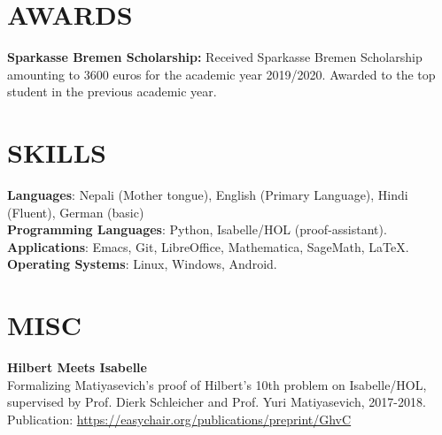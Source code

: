 \documentclass[margin]{res}
\begin{document}
\begin{resume}
\section{AWARDS}
\textbf{Sparkasse Bremen Scholarship:} Received Sparkasse Bremen Scholarship amounting to 3600 euros for the academic year 2019/2020. Awarded to the top student in the previous academic year.

\section{SKILLS}
\textbf{Languages}: Nepali (Mother tongue), English (Primary Language), Hindi (Fluent), German (basic)\\
\textbf{Programming Languages}: Python, Isabelle/HOL (proof-assistant).
\\
\textbf{Applications}: Emacs, Git, LibreOffice, Mathematica, SageMath, \LaTeX.
\\
\textbf{Operating Systems}: 
Linux, Windows, Android.

\section{MISC}
\par
\textbf{Hilbert Meets Isabelle}\\ 
Formalizing Matiyasevich's proof of Hilbert's 10th problem on Isabelle/HOL, supervised by Prof. Dierk Schleicher and Prof. Yuri Matiyasevich, 2017-2018. Publication: \url{https://easychair.org/publications/preprint/GhvC}
\end{resume}
\end{document}
